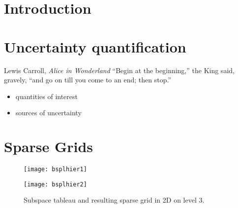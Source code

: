 
\chapter{Introduction}
\label{cha:introduction}


\chapter{Uncertainty quantification}
\label{sec:uncert-quant}

\begin{chapquote}{Lewis Carroll, \textit{Alice in Wonderland}}
  ``Begin at the beginning,'' the King said, gravely, ``and go on till you
  come to an end; then stop.''
\end{chapquote}

\begin{itemize}
\item quantities of interest
\item sources of uncertainty
\end{itemize}

\blindtext
\blindtext
\blindtext
\blindtext
\blindtext
\blindtext
\blindtext
\blindtext
\blindtext
\blindtext
\blindtext
\blindtext
\blindtext
\blindtext
\blindtext
\blindtext

\chapter{Sparse Grids}
\label{cha:sparse-grids}

\begin{figure}
\centering
\begin{minipage}{0.48\textwidth}
\texttt{[image: bsplhier1]}
\end{minipage}
\begin{minipage}{0.48\textwidth}
\texttt{[image: bsplhier2]}
\end{minipage}
\caption{Subspace tableau and resulting sparse grid in 2D on level 3.}
\end{figure}

\cite{zenger91sparse}
\cite{zenger91sparse, Adams12Rigorous}


